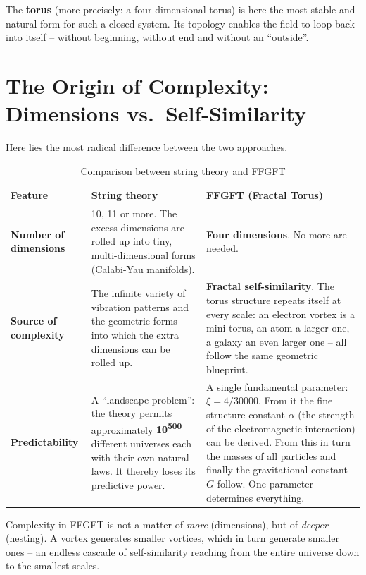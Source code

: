 	The \textbf{torus} (more precisely: a four-dimensional torus) is here the most stable and natural form for such a closed system. Its topology enables the field to loop back into itself -- without beginning, without end and without an ``outside''.
	
	\section{The Origin of Complexity: Dimensions vs.\ Self-Similarity}
	
	Here lies the most radical difference between the two approaches.
	
	\begin{table}[h]
		\centering
		\begin{tabular}{p{4cm} p{5cm} p{5cm}}
			\toprule
			\textbf{Feature} & \textbf{String theory} & \textbf{FFGFT (Fractal Torus)} \\
			\midrule
			\textbf{Number of dimensions} & 10, 11 or more. The excess dimensions are rolled up into tiny, multi-dimensional forms (Calabi-Yau manifolds). & \textbf{Four dimensions}. No more are needed. \\
			\addlinespace
			\textbf{Source of complexity} & The infinite variety of vibration patterns and the geometric forms into which the extra dimensions can be rolled up. & \textbf{Fractal self-similarity}. The torus structure repeats itself at every scale: an electron vortex is a mini-torus, an atom a larger one, a galaxy an even larger one -- all follow the same geometric blueprint. \\
			\addlinespace
			\textbf{Predictability} & A ``landscape problem'': the theory permits approximately \textbf{10\textsuperscript{500}} different universes each with their own natural laws. It thereby loses its predictive power. & A single fundamental parameter: \textbf{$\xi = 4/30000$}. From it the fine structure constant $\alpha$ (the strength of the electromagnetic interaction) can be derived. From this in turn the masses of all particles and finally the gravitational constant $G$ follow. One parameter determines everything. \\
			\bottomrule
		\end{tabular}
		\caption{Comparison between string theory and FFGFT}
		\label{tab:vergleich}
	\end{table}
	
	Complexity in FFGFT is not a matter of \textit{more} (dimensions), but of \textit{deeper} (nesting). A vortex generates smaller vortices, which in turn generate smaller ones -- an endless cascade of self-similarity reaching from the entire universe down to the smallest scales.
	
